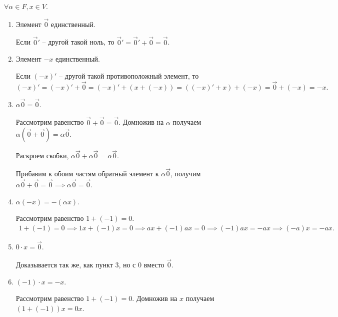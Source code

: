 \documentclass[a4paper]{article}
\begin{document}
\begin{colloq}
            $\forall \alpha \in F, x \in V$.
            \begin{enumerate}
            \item Элемент $\overrightarrow{0}$ единственный.

                Если $\overrightarrow{0}'$ -- другой такой ноль, то $\overrightarrow{0}' = \overrightarrow{0}' + \overrightarrow{0} = \overrightarrow{0}$.

            \item Элемент $-x$ единственный.

                Если $(-x)'$ -- другой такой противоположный элемент, то
                \begin{equation*}
                    (-x)' = (-x)' + \overrightarrow{0} = (-x)' + (x + (-x)) = ((-x)' + x) + (-x) = \overrightarrow{0} + (-x) = -x
                .\end{equation*}
                
            \item $\alpha \overrightarrow{0} = \overrightarrow{0}$.

                \newcommand{\zr}{\overrightarrow{0}}
                Рассмотрим равенство $\zr + \zr = \zr$. Домножив на $\alpha$ получаем $\alpha(\zr + \zr) = \alpha\zr$.

                Раскроем скобки, $\alpha\zr + \alpha\zr = \alpha\zr$. 

                Прибавим к обоим частям обратный элемент к $\alpha\zr$, получим $\alpha\zr + \zr = \zr \implies \alpha\zr = \zr$.

            \item $\alpha (-x) = -(\alpha x)$.

                Рассмотрим равенство $1 + (-1) = 0$.
                \begin{align*}
                    1 + (-1) = 0 \implies 1x + (-1)x = 0 \implies ax + (-1)ax = 0 \implies (-1)ax = -ax \implies (-a)x = -ax
                .\end{align*}

            \item $0 \cdot x = \overrightarrow{0}$.

                Доказывается так же, как пункт 3, но с 0 вместо $\zr$.

            \item $(-1) \cdot x = -x$.

                Рассмотрим равенство $1 + (-1) = 0$. Домножив на $x$ получаем $(1 + (-1))x = 0x$.


\end{enumerate}
\end{colloq}
\end{document}
